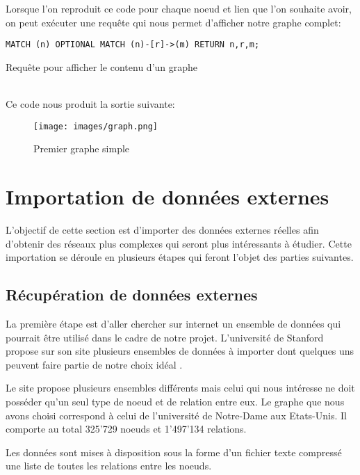 \documentclass[12pt,twoside, openright]{memoir}
\begin{document}
	Lorsque l'on reproduit ce code pour chaque noeud et lien que l'on souhaite avoir, on peut exécuter une requête qui nous permet d'afficher notre graphe complet:\vspace{-3pt}
	\begin{listing}
		\begin{verbatim}
MATCH (n) OPTIONAL MATCH (n)-[r]->(m) RETURN n,r,m;
		\end{verbatim}
		\caption{Requête pour afficher le contenu d'un graphe}
	\end{listing}\\
	Ce code nous produit la sortie suivante:
	\begin{figure}[!ht]
		\center
		\texttt{[image: images/graph.png]}
		\caption{Premier graphe simple}
	\end{figure}	
	\section{Importation de données externes}
	L'objectif de cette section est d'importer des données externes réelles afin d'obtenir des réseaux plus complexes qui seront plus intéressants à étudier. Cette importation se déroule en plusieurs étapes qui feront l'objet des parties suivantes.
	\subsection{Récupération de données externes}
	La première étape est d'aller chercher sur internet un ensemble de données qui pourrait être utilisé dans le cadre de notre projet. L'université de Stanford propose sur son site plusieurs ensembles de données à importer dont quelques uns peuvent faire partie de notre choix idéal \cite{snapnets}.\par
	Le site propose plusieurs ensembles différents mais celui qui nous intéresse ne doit posséder qu'un seul type de noeud et de relation entre eux. Le graphe que nous avons choisi correspond à celui de l'université de Notre-Dame aux Etats-Unis. Il comporte au total 325'729 noeuds et 1'497'134 relations.\par
	Les données sont mises à disposition sous la forme d'un fichier texte compressé une liste de toutes les relations entre les noeuds.
\end{document}
